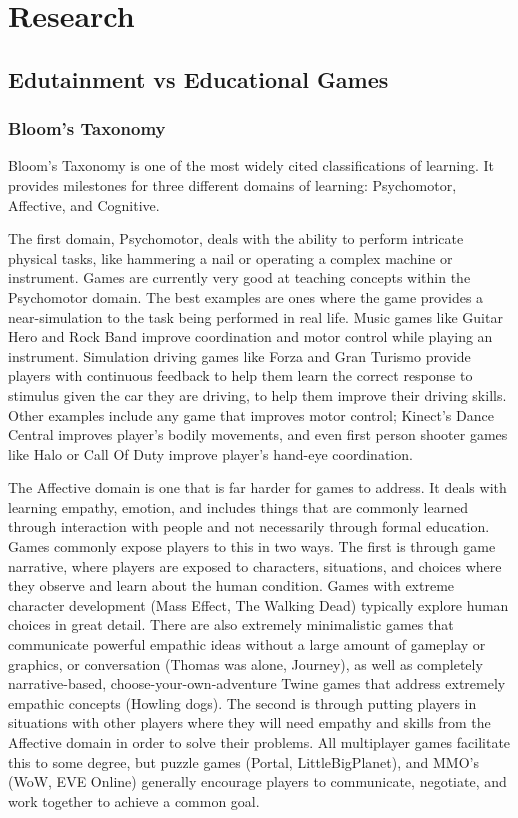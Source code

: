 \documentclass[12pt]{report}
\begin{document}
\section{Research}
	\subsection{Edutainment vs Educational Games}
		\subsubsection{Bloom's Taxonomy}
			Bloom's Taxonomy is one of the most widely cited classifications of learning. It provides milestones for three different domains of learning: Psychomotor, Affective, and Cognitive.

			The first domain, Psychomotor, deals with the ability to perform intricate physical tasks, like hammering a nail or operating a complex machine or instrument. Games are currently very good at teaching concepts within the Psychomotor domain. The best examples are ones where the game provides a near-simulation to the task being performed in real life. Music games like Guitar Hero and Rock Band improve coordination and motor control while playing an instrument. Simulation driving games like Forza and Gran Turismo provide players with continuous feedback to help them learn the correct response to stimulus given the car they are driving, to help them improve their driving skills. Other examples include any game that improves motor control; Kinect's Dance Central improves player's bodily movements, and even first person shooter games like Halo or Call Of Duty improve player's hand-eye coordination.

			The Affective domain is one that is far harder for games to address. It deals with learning empathy, emotion, and includes things that are commonly learned through interaction with people and not necessarily through formal education. Games commonly expose players to this in two ways. The first is through game narrative, where players are exposed to characters, situations, and choices where they observe and learn about the human condition. Games with extreme character development (Mass Effect, The Walking Dead) typically explore human choices in great detail. There are also extremely minimalistic games that communicate powerful empathic ideas without a large amount of gameplay or graphics, or conversation (Thomas was alone, Journey), as well as completely narrative-based, choose-your-own-adventure Twine games that address extremely empathic concepts (Howling dogs). The second is through putting players in situations with other players where they will need empathy and skills from the Affective domain in order to solve their problems. All multiplayer games facilitate this to some degree, but puzzle games (Portal, LittleBigPlanet), and MMO's (WoW, EVE Online) generally encourage players to communicate, negotiate, and work together to achieve a common goal.
\end{document}
